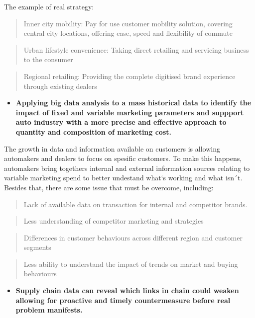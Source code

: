 \documentclass[]{book}
\providecommand{\tightlist}{%
  \setlength{\itemsep}{0pt}\setlength{\parskip}{0pt}}
\begin{document}
The example of real strategy:

\begin{quote}
Inner city mobility: Pay for use customer mobility solution, covering
central city locations, offering ease, speed and flexibility of commute
\end{quote}

\begin{quote}
Urban lifestyle convenience: Taking direct retailing and servicing
business to the consumer
\end{quote}

\begin{quote}
Regional retailing: Providing the complete digitised brand experience
through existing dealers
\end{quote}

\begin{itemize}
\tightlist
\item
  \textbf{Applying big data analysis to a mass historical data to
  identify the impact of fixed and variable marketing parameters and
  suppport auto industry with a more precise and effective approach to
  quantity and composition of marketing cost.}
\end{itemize}

The growth in data and information available on customers is allowing
automakers and dealers to focus on spesific customers. To make this
happens, automakers bring togethers internal and external information
sources relating to variable marketing spend to better undestand what`s
working and what isn´t. Besides that, there are some issue that must be
overcome, including:

\begin{quote}
Lack of available data on transaction for internal and competitor
brands.
\end{quote}

\begin{quote}
Less understanding of competitor marketing and strategies
\end{quote}

\begin{quote}
Differences in customer behaviours across different region and customer
segments
\end{quote}

\begin{quote}
Less ability to understand the impact of trends on market and buying
behaviours
\end{quote}

\begin{itemize}
\tightlist
\item
  \textbf{Supply chain data can reveal which links in chain could weaken
  allowing for proactive and timely countermeasure before real problem
  manifests.}
\end{itemize}
\end{document}
